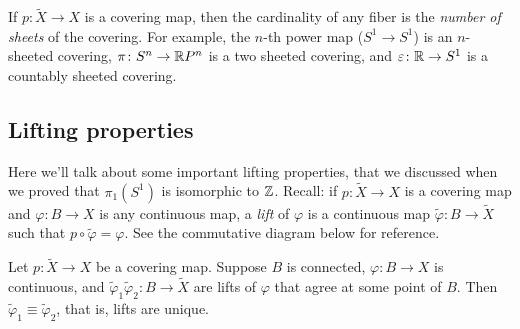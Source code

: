 If $p \colon \widetilde X \to X$ is a covering map, then the cardinality of any fiber is the \emph{number of sheets} of the covering. For example, the $n$-th power map ($S^{1} \to S^{1} $) is an $n$-sheeted covering, $\pi \colon S^n \to \mathbb{R} P^n$ is a two sheeted covering, and $\varepsilon \colon \mathbb{R} \to S^{1} $ is a countably sheeted covering.

\subsection{Lifting properties}
Here we'll talk about some important lifting properties, that we discussed when we proved that $\pi_1(S^{1} )$ is isomorphic to $\mathbb{Z}$. Recall: if $p \colon \widetilde X \to X$ is a covering map and $\varphi \colon B \to X$ is any continuous map, a \emph{lift} of $\varphi $ is a continuous map $\widetilde\varphi \colon B \to \widetilde X$ such that $p \circ \widetilde\varphi =\varphi $. See the commutative diagram below for reference.
            \begin{figure}[H]
                \centering
{}
            \end{figure}
            \begin{prop}
  Let $p \colon \widetilde X \to X$ be a covering map. Suppose $B$ is connected, $\varphi \colon B \to X$ is continuous, and $\widetilde\varphi_1 \widetilde\varphi_2 \colon B \to \widetilde X$ are lifts of $\varphi $ that agree at some point of $B$. Then $\widetilde \varphi_1\equiv \widetilde \varphi_2$, that is, lifts are unique.
\end{prop}
